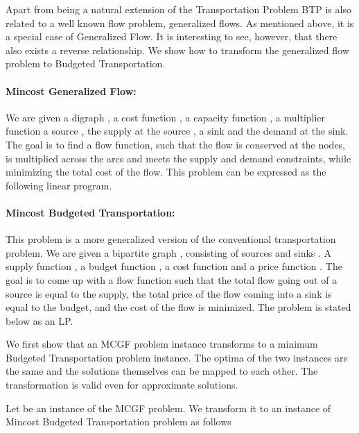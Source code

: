 \documentclass[11pt]{article}
\begin{document}
Apart from being a natural extension of the Transportation Problem BTP is also
related to a well known flow problem, generalized flows. As mentioned above,
it is a special case of Generalized Flow. It is interesting to see, however, that
there  also exists a reverse relationship. We show how to transform the 
generalized flow problem
to Budgeted Transportation.



\paragraph*{Mincost Generalized Flow: }
We are given a digraph , a cost function , a
capacity function , a multiplier function 
 a source , the supply at the source 
, a sink  and the demand  at the sink. The goal
is to find a flow function,   such that the flow 
is conserved at the nodes,
is multiplied across the arcs and meets the supply and demand constraints, 
while minimizing the total cost of the flow. This problem can be expressed as
the following linear program.







\paragraph*{Mincost Budgeted Transportation: }

This problem is a more generalized version of the conventional 
transportation problem. We are given a bipartite graph , consisting
of sources  and sinks . A supply function 
, a budget function , a cost 
function  and a price function 
. The goal 
is to come up with a flow function  such
that the total flow going out of a source is equal to the supply,
the total price of the flow coming into a sink is equal to the budget,
and the cost of the flow is minimized. The problem is stated below 
as an LP.






We first show that an MCGF problem instance  transforms to a minimum Budgeted
Transportation problem instance. The optima of the two instances are the
same and the solutions themselves can be mapped to each other. The transformation
is valid even for approximate solutions.

Let 
be an instance of the MCGF problem. We transform it
to an instance 
of Mincost Budgeted Transportation problem as follows
\end{document}
